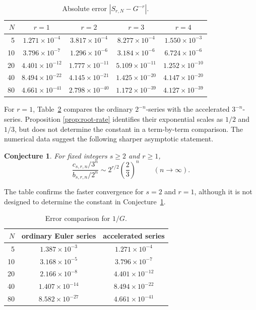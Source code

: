\documentclass[11pt,reqno]{amsart}
\numberwithin{equation}{section}
\newtheorem{conjecture}[theorem]{Conjecture}
\theoremstyle{definition}
\theoremstyle{remark}
\newcommand{\Gconst}{G}
\begin{document}
\begin{table}[ht]
\centering
\caption{Absolute error
\(\left|S_{r,N}-\Gconst^{-r}\right|\).}\label{tab:errors}
\small
\begin{tabular}{r c c c c}
\toprule
\(N\)&\(r=1\)&\(r=2\)&\(r=3\)&\(r=4\)\\
\midrule
5  &\(1.271{\times}10^{-4}\)&\(3.817{\times}10^{-4}\)
   &\(8.277{\times}10^{-4}\)&\(1.550{\times}10^{-3}\)\\
10 &\(3.796{\times}10^{-7}\)&\(1.296{\times}10^{-6}\)
   &\(3.184{\times}10^{-6}\)&\(6.724{\times}10^{-6}\)\\
20 &\(4.401{\times}10^{-12}\)&\(1.777{\times}10^{-11}\)
   &\(5.109{\times}10^{-11}\)&\(1.252{\times}10^{-10}\)\\
40 &\(8.494{\times}10^{-22}\)&\(4.145{\times}10^{-21}\)
   &\(1.425{\times}10^{-20}\)&\(4.147{\times}10^{-20}\)\\
80 &\(4.661{\times}10^{-41}\)&\(2.798{\times}10^{-40}\)
   &\(1.172{\times}10^{-39}\)&\(4.127{\times}10^{-39}\)\\
\bottomrule
\end{tabular}
\end{table}

For \(r=1\), Table~\ref{tab:compare} compares the ordinary
\(2^{-n}\)-series with the accelerated \(3^{-n}\)-series.  Proposition
\ref{prop:root-rate} identifies their exponential scales as \(1/2\)
and \(1/3\), but does not determine the constant in a term-by-term
comparison.  The numerical data suggest the following sharper
asymptotic statement.

\begin{conjecture}\label{conj:term-ratio}
For fixed integers \(s\geq2\) and \(r\geq1\),
\begin{equation}\label{eq:conjectured-term-ratio}
 \frac{c_{s,r,n}/3^n}{b_{s,r,n}/2^n}
 \sim
 2^{r/2}\left(\frac23\right)^n
 \qquad(n\to\infty).
\end{equation}
\end{conjecture}

The table confirms the faster convergence for \(s=2\) and \(r=1\),
although it is not designed to determine the constant in
Conjecture~\ref{conj:term-ratio}.

\begin{table}[ht]
\centering
\caption{Error comparison for \(1/\Gconst\).}\label{tab:compare}
\small
\begin{tabular}{r c c}
\toprule
\(N\)&ordinary Euler series&accelerated series\\
\midrule
5  &\(1.387{\times}10^{-3}\)&\(1.271{\times}10^{-4}\)\\
10 &\(3.168{\times}10^{-5}\)&\(3.796{\times}10^{-7}\)\\
20 &\(2.166{\times}10^{-8}\)&\(4.401{\times}10^{-12}\)\\
40 &\(1.407{\times}10^{-14}\)&\(8.494{\times}10^{-22}\)\\
80 &\(8.582{\times}10^{-27}\)&\(4.661{\times}10^{-41}\)\\
\bottomrule
\end{tabular}
\end{table}
\end{document}
